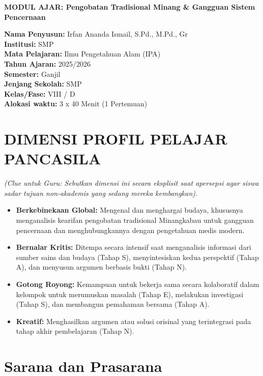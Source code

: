 \documentclass[a4paper,12pt]{article}
\begin{document}
\begin{center}
{\Large\textbf{MODUL AJAR: Pengobatan Tradisional Minang \& Gangguan Sistem Pencernaan}}
\end{center}

\vspace{0.5cm}

\begin{tcolorbox}[mainbox]
\textbf{Nama Penyusun:} Irfan Ananda Ismail, S.Pd., M.Pd., Gr \\
\textbf{Institusi:} SMP \\
\textbf{Mata Pelajaran:} Ilmu Pengetahuan Alam (IPA) \\
\textbf{Tahun Ajaran:} 2025/2026 \\
\textbf{Semester:} Ganjil \\
\textbf{Jenjang Sekolah:} SMP \\
\textbf{Kelas/Fase:} VIII / D \\
\textbf{Alokasi waktu:} 3 x 40 Menit (1 Pertemuan)
\end{tcolorbox}

\section{DIMENSI PROFIL PELAJAR PANCASILA}
\textit{(Clue untuk Guru: Sebutkan dimensi ini secara eksplisit saat apersepsi agar siswa sadar tujuan non-akademis yang sedang mereka kembangkan).}

\begin{itemize}
\item \textbf{Berkebinekaan Global:} Mengenal dan menghargai budaya, khususnya menganalisis kearifan pengobatan tradisional Minangkabau untuk gangguan pencernaan dan menghubungkannya dengan pengetahuan medis modern.
\item \textbf{Bernalar Kritis:} Ditempa secara intensif saat menganalisis informasi dari sumber sains dan budaya (Tahap S), menyintesiskan kedua perspektif (Tahap A), dan menyusun argumen berbasis bukti (Tahap N).
\item \textbf{Gotong Royong:} Kemampuan untuk bekerja sama secara kolaboratif dalam kelompok untuk merumuskan masalah (Tahap E), melakukan investigasi (Tahap S), dan membangun pemahaman bersama (Tahap A).
\item \textbf{Kreatif:} Menghasilkan argumen atau solusi orisinal yang terintegrasi pada tahap akhir pembelajaran (Tahap N).
\end{itemize}

\section{Sarana dan Prasarana}
\end{document}
